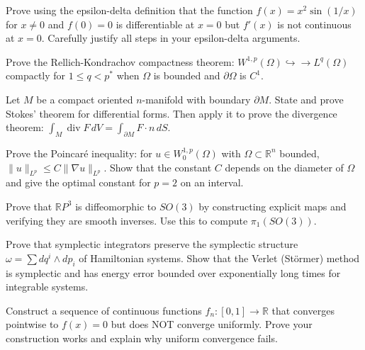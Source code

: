 \documentclass[12pt,a4paper]{exam}
\begin{document}
\begin{questions}

\question[5]
Prove using the epsilon-delta definition that the function $f(x) = x^2 \sin(1/x)$ for $x \neq 0$ and $f(0) = 0$ is differentiable at $x = 0$ but $f'(x)$ is not continuous at $x = 0$. Carefully justify all steps in your epsilon-delta arguments.

\vspace{0.3cm}

\question[3]
Prove the Rellich-Kondrachov compactness theorem: $W^{1,p}(\Omega) \hookrightarrow\!\!\!\to L^q(\Omega)$ compactly for $1 \leq q < p^*$ when $\Omega$ is bounded and $\partial\Omega$ is $C^1$.

\vspace{0.3cm}

\question[2]
Let $M$ be a compact oriented $n$-manifold with boundary $\partial M$. State and prove Stokes' theorem for differential forms. Then apply it to prove the divergence theorem: $\int_M \operatorname{div} F \, dV = \int_{\partial M} F \cdot n \, dS$.

\vspace{0.3cm}

\question[4]
Prove the Poincar\'e inequality: for $u \in W_0^{1,p}(\Omega)$ with $\Omega \subset \mathbb{R}^n$ bounded, $\|u\|_{L^p} \leq C \|\nabla u\|_{L^p}$. Show that the constant $C$ depends on the diameter of $\Omega$ and give the optimal constant for $p=2$ on an interval.

\vspace{0.3cm}

\question[4]
Prove that $\mathbb{R}P^3$ is diffeomorphic to $SO(3)$ by constructing explicit maps and verifying they are smooth inverses. Use this to compute $\pi_1(SO(3))$.

\vspace{0.3cm}

\question[3]
Prove that symplectic integrators preserve the symplectic structure $\omega = \sum dq^i \wedge dp_i$ of Hamiltonian systems. Show that the Verlet (St\"ormer) method is symplectic and has energy error bounded over exponentially long times for integrable systems.

\vspace{0.3cm}

\question[6]
Construct a sequence of continuous functions $f_n: [0,1] \to \mathbb{R}$ that converges pointwise to $f(x) = 0$ but does NOT converge uniformly. Prove your construction works and explain why uniform convergence fails.


\end{questions}
\end{document}
